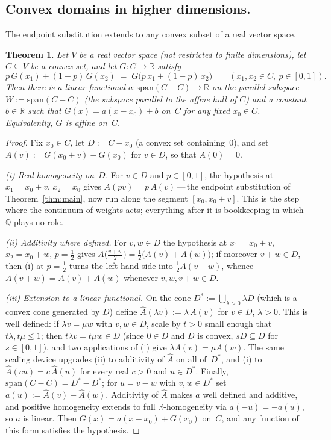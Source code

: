 \documentclass{article}
\theoremstyle{plain}
\newtheorem{theorem}{Theorem}
\theoremstyle{definition}
\newcommand{\R}{\mathbb{R}}
\newcommand{\Q}{\mathbb{Q}}
\begin{document}
\subsection{Convex domains in higher dimensions.}
\label{ssec:higher}

The endpoint substitution extends to any convex subset of a real vector
space.

\begin{theorem}\label{thm:higher}
Let $V$ be a real vector space (not restricted to finite dimensions), let
$C\subseteq V$ be a convex set, and let $G\colon C\to\R$ satisfy
\[
p\,G(x_1)+(1-p)\,G(x_2) \;=\;
G\bigl(p\,x_1+(1-p)\,x_2\bigr) \qquad (x_1,x_2\in C,\ p\in[0,1]).
\]
Then there is a linear functional $a\colon\mathrm{span}(C-C)\to\R$ on the
parallel subspace $W := \mathrm{span}(C-C)$ (the subspace parallel to the
affine hull of $C$) and a constant $b\in\R$ such that $G(x)=a(x-x_0)+b$
on~$C$ for any fixed $x_0\in C$. Equivalently, $G$ is affine on~$C$.
\end{theorem}

\begin{proof}
Fix $x_0\in C$, let $D:=C-x_0$ (a convex set containing~$0$), and set
$A(v):=G(x_0+v)-G(x_0)$ for $v\in D$, so that $A(0)=0$.

\emph{(i) Real homogeneity on~$D$.} For $v\in D$ and $p\in[0,1]$, the
hypothesis at $x_1=x_0+v$, $x_2=x_0$ gives $A(pv)=p\,A(v)$\,---\,the
endpoint substitution of Theorem~\ref{thm:main}, now run along the
segment $[x_0,x_0+v]$. This is the step where the continuum of weights
acts; everything after it is bookkeeping in which $\Q$ plays no role.

\emph{(ii) Additivity where defined.} For $v,w\in D$ the hypothesis at
$x_1=x_0+v$, $x_2=x_0+w$, $p=\tfrac12$ gives
$A\bigl(\tfrac{v+w}{2}\bigr)=\tfrac12\bigl(A(v)+A(w)\bigr)$; if
moreover $v+w\in D$, then (i) at $p=\tfrac12$ turns the left-hand side
into $\tfrac12 A(v+w)$, whence $A(v+w)=A(v)+A(w)$ whenever
$v,w,v+w\in D$.

\emph{(iii) Extension to a linear functional.} On the cone
$D^{\ast}:=\bigcup_{\lambda>0}\lambda D$ (which is a convex cone generated
by $D$) define $\hat A(\lambda v):=\lambda\,A(v)$ for $v\in D$, $\lambda>0$. This is
well defined: if $\lambda v=\mu w$ with $v,w\in D$, scale by $t>0$
small enough that $t\lambda,t\mu\le1$; then $t\lambda v=t\mu w\in D$
(since $0\in D$ and $D$ is convex, $sD\subseteq D$ for $s\in[0,1]$),
and two applications of (i) give $\lambda A(v)=\mu A(w)$. The same
scaling device upgrades (ii) to additivity of $\hat A$ on all
of~$D^{\ast}$, and (i) to $\hat A(cu)=c\,\hat A(u)$ for every real
$c>0$ and $u\in D^{\ast}$. Finally,
$\mathrm{span}(C-C)=D^{\ast}-D^{\ast}$; for $u=v-w$ with
$v,w\in D^{\ast}$ set $a(u):=\hat A(v)-\hat A(w)$. Additivity of
$\hat A$ makes $a$ well defined and additive, and positive homogeneity
extends to full $\R$-homogeneity via $a(-u)=-a(u)$, so $a$ is linear.
Then $G(x)=a(x-x_0)+G(x_0)$ on~$C$, and any function of this form
satisfies the hypothesis.
\end{proof}
\end{document}
